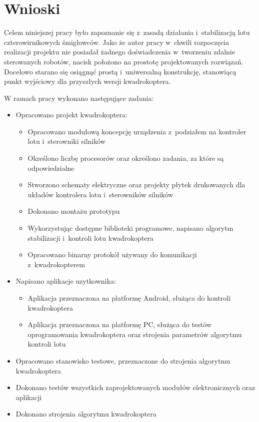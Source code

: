 
\chapter{Wnioski} %

\label{Chapter8} %


Celem niniejszej pracy było zapoznanie się z~zasadą działania i~stabilizacją lotu czterowirnikowych śmigłowców. Jako że autor pracy w~chwili rozpoczęcia realizacji projektu nie posiadał żadnego doświadczenia w~tworzeniu zdalnie sterowanych robotów, nacisk położono na prostotę projektowanych rozwiązań. Docelowo starano się osiągnąć prostą i~uniwersalną konstrukcję, stanowiącą punkt wyjściowy dla przyszłych wersji kwadrokoptera.

W ramach pracy wykonano następujące zadania:
\begin{itemize}
	\item Opracowano projekt kwadrokoptera:
	\begin{itemize}
		\item Opracowano modułową koncepcję urządzenia z~podziałem na kontroler lotu i~sterowniki silników
		\item Określono liczbę procesorów oraz określono zadania, za które są odpowiedzialne
		\item Stworzono schematy elektryczne oraz projekty płytek drukowanych dla układów kontrolera lotu i~sterowników silników
		\item Dokonano montażu prototypu
		\item Wykorzystując dostępne biblioteki programowe, napisano algorytm stabilizacji i~kontroli lotu kwadrokoptera
		\item Opracowano binarny protokół używany do komunikacji z~kwadrokopterem
	\end{itemize}
	\item Napisano aplikacje uzytkownika:
	\begin{itemize}
		\item Aplikacja przeznaczona na platformę Android, służąca do kontroli kwadrokoptera
		\item Aplikacja przeznaczona na platformę PC, służąca do testów oprogramowania kwadrokoptera oraz strojenia parametrów algorytmu kontroli lotu
	\end{itemize}
	\item Opracowano stanowisko testowe, przeznaczone do strojenia algorytmu kwadrokoptera	
	\item Dokonano testów wszystkich zaprojektowanych modułów elektronicznych oraz aplikacji
	\item Dokonano strojenia algorytmu kwadrokoptera
\end{itemize}

